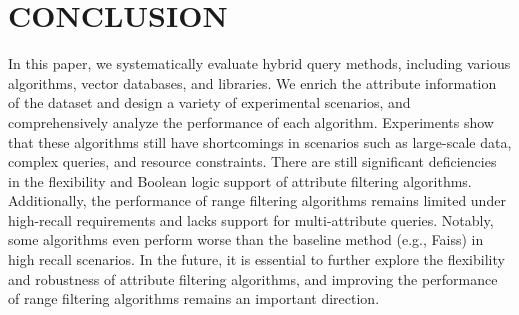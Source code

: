 \documentclass[sigconf, nonacm]{acmart}
\begin{document}
	\section{CONCLUSION}
	In this paper, we systematically evaluate hybrid query methods, including various algorithms, vector databases, and libraries. We enrich the attribute information of the dataset and design a variety of experimental scenarios, and comprehensively analyze the performance of each algorithm. Experiments show that these algorithms still have shortcomings in scenarios such as large-scale data, complex queries, and resource constraints. There are still significant deficiencies in the flexibility and Boolean logic support of attribute filtering algorithms. Additionally, the performance of range filtering algorithms remains limited under high-recall requirements and lacks support for multi-attribute queries. Notably, some algorithms even perform worse than the baseline method (e.g., Faiss) in high recall scenarios.  In the future, it is essential to further explore the flexibility and robustness of attribute filtering algorithms, and improving the performance of range filtering algorithms remains an important direction.
%	
	
	
	
	\clearpage
	
	
	
\end{document}
